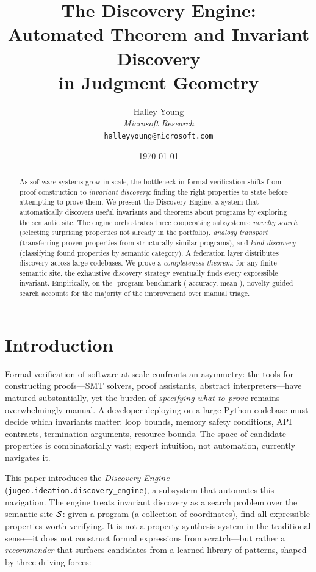 \documentclass[11pt]{article}
\title{\textbf{The Discovery Engine:\\
Automated Theorem and Invariant Discovery\\
in Judgment Geometry}}
\author{%
  Halley Young\\
  \textit{Microsoft Research}\\
  \texttt{halleyyoung@microsoft.com}
}
\date{\today}
\begin{document}
\maketitle

\begin{abstract}
As software systems grow in scale, the bottleneck in formal verification
shifts from proof construction to \emph{invariant discovery}: finding
the right properties to state before attempting to prove them.
We present the \JuGeo{} Discovery Engine, a system that automatically
discovers useful invariants and theorems about programs by exploring
the semantic site.  The engine orchestrates three cooperating subsystems:
\emph{novelty search} (selecting surprising properties not already in
the portfolio), \emph{analogy transport} (transferring proven properties
from structurally similar programs), and \emph{kind discovery}
(classifying found properties by semantic category).  A federation layer
distributes discovery across large codebases.
We prove a \emph{completeness theorem}: for any finite semantic site,
the exhaustive discovery strategy eventually finds every expressible
invariant.  Empirically, on the \expTotalPrograms-program benchmark (\expAccuracy{} accuracy,
mean \expTimeMean), novelty-guided search accounts for the majority of
the improvement over manual triage.
\end{abstract}

\newpage

\section{Introduction}\label{sec:intro}

Formal verification of software at scale confronts an asymmetry:
the tools for constructing proofs---SMT solvers, proof assistants,
abstract interpreters---have matured substantially, yet the burden of
\emph{specifying what to prove} remains overwhelmingly manual.  A
developer deploying \JuGeo{} on a large Python codebase must decide
which invariants matter: loop bounds, memory safety conditions,
API contracts, termination arguments, resource bounds.  The space of
candidate properties is combinatorially vast; expert intuition, not
automation, currently navigates it.

This paper introduces the \JuGeo{} \emph{Discovery Engine}
(\texttt{jugeo.ideation.discovery\_engine}), a subsystem that
automates this navigation.  The engine treats invariant discovery as a
search problem over the semantic site $\mathcal{S}$: given a program (a
collection of coordinates), find all expressible properties worth
verifying.  It is not a property-synthesis system in the traditional
sense---it does not construct formal expressions from scratch---but
rather a \emph{recommender} that surfaces candidates from a learned
library of patterns, shaped by three driving forces:
\end{document}
